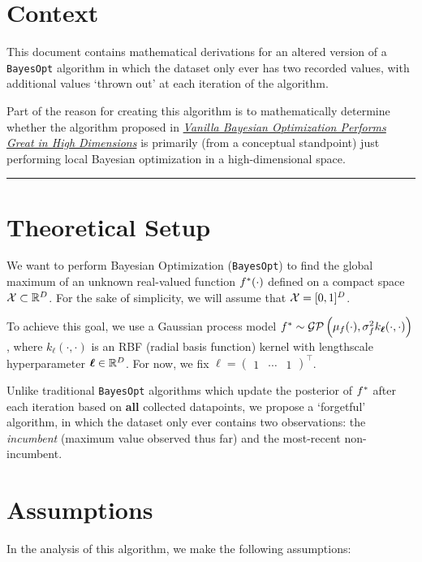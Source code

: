 \documentclass[11pt]{article}
\numberwithin{figure}{section}
\numberwithin{equation}{section}
\def\BayesOpt{\texttt{BayesOpt}}
\def\calGP{\mathcal{GP}}
\newcommand{\bs}[1]{\boldsymbol{#1}}
\def\bell{\bs{\ell}}
\begin{document}
\section{Context}

This document contains mathematical derivations for an altered version of a \BayesOpt{} algorithm in which the dataset only ever has two recorded values, with additional values `thrown out' at each iteration of the algorithm.

Part of the reason for creating this algorithm is to mathematically determine whether the algorithm proposed in \href{https://arxiv.org/abs/2402.02229}{\textit{Vanilla Bayesian Optimization Performs Great in High Dimensions}} is primarily (from a conceptual standpoint) just performing local Bayesian optimization in a high-dimensional space.

\noindent\rule{\textwidth}{0.8pt}

\section{Theoretical Setup}

We want to perform Bayesian Optimization (\BayesOpt) to find the global maximum of an unknown real-valued function $f^{*}(\cdot)$ defined on a compact space $\mathcal{X} \subset \mathbb{R}^{D}$. For the sake of simplicity, we will assume that $\mathcal{X} = [0,1]^{D}$.

To achieve this goal, we use a Gaussian process model $\fstar \sim \calGP\left(\mu_{f}(\cdot), \sigma_{f}^{2}k_{\bell}(\cdot, \cdot)\right)$, where $k_{\bell}(\cdot, \cdot)$ is an RBF (radial basis function) kernel with lengthscale hyperparameter $\bell \in \bbR^{D}$. For now, we fix $\bell = \begin{pmatrix}1 & \cdots & 1\end{pmatrix}^{\top}$.

Unlike traditional \BayesOpt{} algorithms which update the posterior of $f^{*}$ after each iteration based on \textbf{all} collected datapoints, we propose a `forgetful' algorithm, in which the dataset only ever contains two observations: the \textit{incumbent} (maximum value observed thus far) and the most-recent non-incumbent.

\section{Assumptions}

In the analysis of this algorithm, we make the following assumptions:
\end{document}
